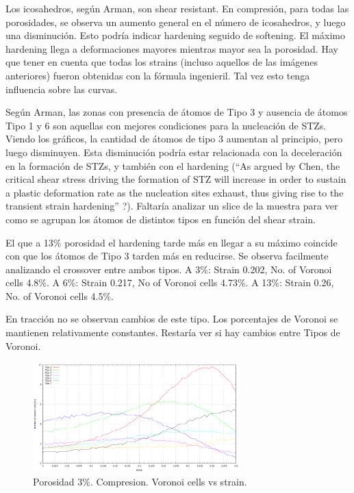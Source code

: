 \documentclass[10pt, oneside]{article} %
\begin{document}
Los icosahedros, según Arman, son shear resistant. En compresión, para todas las porosidades, se observa un aumento general en el número de icosahedros, y luego una disminución. Esto podría indicar hardening seguido de softening. El máximo hardening llega a deformaciones mayores mientras mayor sea la porosidad. Hay que tener en cuenta que todas los strains (incluso aquellos de las imágenes anteriores) fueron obtenidas con la fórmula ingenieril. Tal vez esto tenga influencia sobre las curvas.

Según Arman, las zonas con presencia de átomos de Tipo 3 y ausencia de átomos Tipo 1 y 6 son aquellas con mejores condiciones para la nucleación de STZs. Viendo los gráficos, la cantidad de átomos de tipo 3 aumentan al principio, pero luego disminuyen. Esta disminución podría estar relacionada con la deceleración en la formación de STZs, y también con el hardening (“As argued by Chen, the critical shear stress driving the formation of STZ will increase in order to sustain a plastic deformation rate as the nucleation sites exhaust, thus giving rise to the transient strain hardening” ?). Faltaría analizar un slice de la muestra para ver como se agrupan los átomos de distintos tipos en función del shear strain.

El que a 13\% porosidad el hardening tarde más en llegar a su máximo coincide con que los átomos de Tipo 3 tarden más en reducirse. Se observa facilmente analizando el crossover entre ambos tipos. A 3\%: Strain 0.202, No. of Voronoi cells 4.8\%. A 6\%: Strain 0.217, No of Voronoi cells 4.73\%. A 13\%: Strain 0.26, No. of Voronoi cells 4.5\%.

En tracción no se observan cambios de este tipo. Los porcentajes de Voronoi se mantienen relativamente constantes. Restaría ver si hay cambios entre Tipos de Voronoi.

\begin{figure}[H]
\centering
\includegraphics[width=8cm]{Figures/Porosidad/Porosidad_3_noVoronoi_strain.png}
\caption{Porosidad 3\%. Compresion. Voronoi cells vs strain.}
\end{figure}
\end{document}
